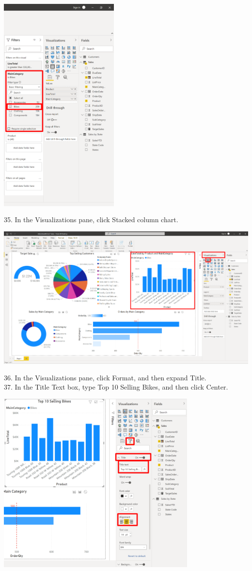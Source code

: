 \documentclass[12pt,letterpaper]{article}
\begin{document}
\begin{center}
    \includegraphics[width=6cm]{img/96.png}
\end{center}
35. In the Visualizations pane, click Stacked column chart.
\begin{center}
    \includegraphics[width=17cm]{img/97.png}
    \vspace{1cm}
\end{center}
36. In the Visualizations pane, click Format, and then expand Title.
\\37. In the Title Text box, type Top 10 Selling Bikes, and then click Center.
\begin{center}
    \includegraphics[width=10cm]{img/98.png}
    \vspace{1cm}
\end{center}
\end{document}
